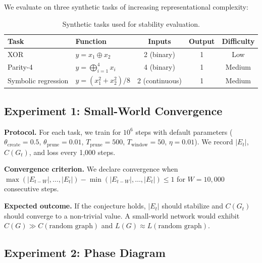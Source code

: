 \documentclass[12pt]{article}
\begin{document}
We evaluate on three synthetic tasks of increasing representational complexity:

\begin{table}[H]
\centering
\small
\begin{tabular}{llccc}
\toprule
\textbf{Task} & \textbf{Function} & \textbf{Inputs} & \textbf{Output} & \textbf{Difficulty} \\
\midrule
XOR & $y = x_1 \oplus x_2$ & 2 (binary) & 1 & Low \\
Parity-4 & $y = \bigoplus_{i=1}^{4} x_i$ & 4 (binary) & 1 & Medium \\
Symbolic regression & $y = (x_1^2 + x_2^2) / 8$ & 2 (continuous) & 1 & Medium \\
\bottomrule
\end{tabular}
\caption{Synthetic tasks used for stability evaluation.}
\end{table}

\subsection{Experiment 1: Small-World Convergence}

\textbf{Protocol.} For each task, we train for $10^6$ steps with default parameters ($\theta_{\text{create}} = 0.5$, $\theta_{\text{prune}} = 0.01$, $T_{\text{prune}} = 500$, $T_{\text{window}} = 50$, $\eta = 0.01$). We record $|E_t|$, $C(G_t)$, and loss every 1,000 steps.

\textbf{Convergence criterion.} We declare convergence when $\max(|E_{t-W}|, \ldots, |E_t|) - \min(|E_{t-W}|, \ldots, |E_t|) \leq 1$ for $W = 10,000$ consecutive steps.

\textbf{Expected outcome.} If the conjecture holds, $|E_t|$ should stabilize and $C(G_t)$ should converge to a non-trivial value. A small-world network \cite{watts1998} would exhibit $C(G) \gg C(\text{random graph})$ and $L(G) \approx L(\text{random graph})$.

\subsection{Experiment 2: Phase Diagram}
\end{document}
